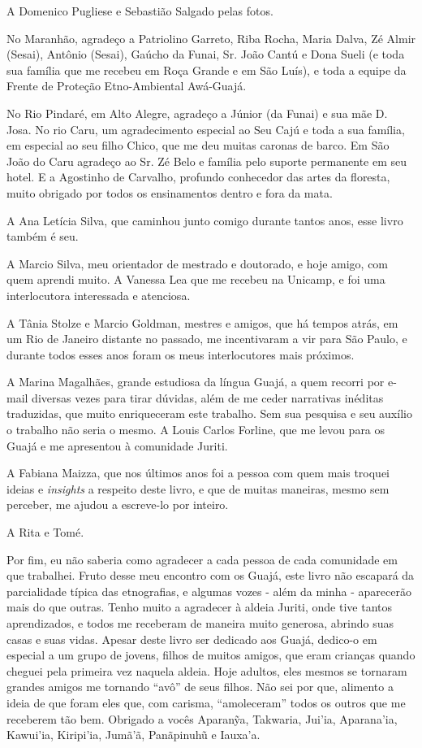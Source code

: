 A Domenico Pugliese e Sebastião Salgado pelas fotos.

No Maranhão, agradeço a Patriolino Garreto, Riba Rocha, Maria Dalva, Zé
Almir (Sesai), Antônio (Sesai), Gaúcho da Funai, Sr. João Cantú e Dona
Sueli (e toda sua família que me recebeu em Roça Grande e em São Luís),
e toda a equipe da Frente de Proteção Etno-Ambiental Awá-Guajá.

No Rio Pindaré, em Alto Alegre, agradeço a Júnior (da Funai) e sua mãe
D. Josa. No rio Caru, um agradecimento especial ao Seu Cajú e toda a sua
família, em especial ao seu filho Chico, que me deu muitas caronas de
barco. Em São João do Caru agradeço ao Sr. Zé Belo e família pelo
suporte permanente em seu hotel. E a Agostinho de Carvalho, profundo
conhecedor das artes da floresta, muito obrigado por todos os
ensinamentos dentro e fora da mata.

A Ana Letícia Silva, que caminhou junto comigo durante tantos anos, esse
livro também é seu.

A Marcio Silva, meu orientador de mestrado e doutorado, e hoje amigo,
com quem aprendi muito. A Vanessa Lea que me recebeu na Unicamp, e foi
uma interlocutora interessada e atenciosa.

A Tânia Stolze e Marcio Goldman, mestres e amigos, que há tempos atrás,
em um Rio de Janeiro distante no passado, me incentivaram a vir para São
Paulo, e durante todos esses anos foram os meus interlocutores mais
próximos.

A Marina Magalhães, grande estudiosa da língua Guajá, a quem recorri por
e-mail diversas vezes para tirar dúvidas, além de me ceder narrativas
inéditas traduzidas, que muito enriqueceram este trabalho. Sem sua
pesquisa e seu auxílio o trabalho não seria o mesmo. A Louis Carlos
Forline, que me levou para os Guajá e me apresentou à comunidade Juriti.

A Fabiana Maizza, que nos últimos anos foi a pessoa com quem mais
troquei ideias e \emph{insights} a respeito deste livro, e que de muitas
maneiras, mesmo sem perceber, me ajudou a escreve-lo por inteiro.

A Rita e Tomé.

Por fim, eu não saberia como agradecer a cada pessoa de cada comunidade
em que trabalhei. Fruto desse meu encontro com os Guajá, este livro não
escapará da parcialidade típica das etnografias, e algumas vozes - além
da minha - aparecerão mais do que outras. Tenho muito a agradecer à
aldeia Juriti, onde tive tantos aprendizados, e todos me receberam de
maneira muito generosa, abrindo suas casas e suas vidas. Apesar deste
livro ser dedicado aos Guajá, dedico-o em especial a um grupo de jovens,
filhos de muitos amigos, que eram crianças quando cheguei pela primeira
vez naquela aldeia. Hoje adultos, eles mesmos se tornaram grandes amigos
me tornando ``avô'' de seus filhos. Não sei por que, alimento a ideia de
que foram eles que, com carisma, ``amoleceram'' todos os outros que me
receberem tão bem. Obrigado a vocês Aparanỹa, Takwaria, Jui'ia,
Aparana'ia, Kawui'ia, Kiripi'ia, Jumã'ã, Panãpinuhũ e Iauxa'a.

